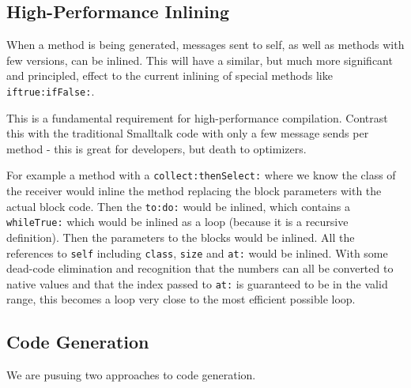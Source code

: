 \documentclass[
]{ceurart}
\begin{document}
\subsection{High-Performance Inlining}

When a method is being generated, messages sent to self, as well as methods with few versions, can be inlined.
This will have a similar, but much more significant and principled, effect to the current inlining of special methods like \verb|iftrue:ifFalse:|.

This is a fundamental requirement for high-performance compilation.
Contrast this with the traditional Smalltalk code with only a few message sends per method - this is great for developers, but death to optimizers.

For example a method with a \verb_collect:thenSelect:_ where we know the class of the receiver would inline the method replacing the block parameters with the actual block code.
Then the \verb_to:do:_ would be inlined, which contains a \verb_whileTrue:_ which would be inlined as a loop (because it is a recursive definition).
Then the parameters to the blocks would be inlined.
All the references to \verb_self_ including \verb_class_, \verb_size_ and \verb_at:_ would be inlined.
With some dead-code elimination and recognition that the numbers can all be converted to native values and that the index passed to \verb_at:_ is guaranteed to be in the valid range, this becomes a loop very close to the most efficient possible loop.

\subsection{Code Generation}
We are pusuing two approaches to code generation.
\end{document}

